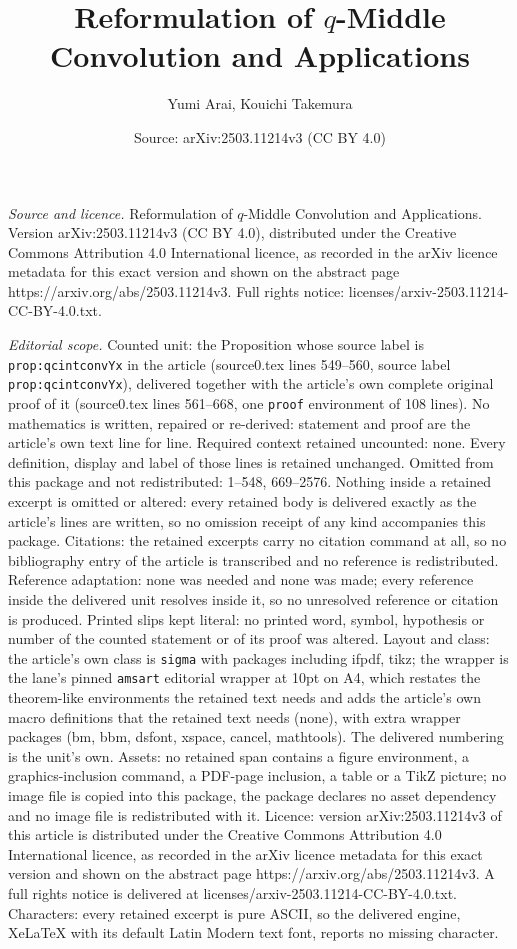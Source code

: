 \documentclass[10pt,a4paper]{amsart}
\title[Reformulation of $q$-Middle Convolution and Applications]{Reformulation of $q$-Middle Convolution and Applications}
\author{Yumi Arai, Kouichi Takemura}
\date{Source: arXiv:2503.11214v3 (CC BY 4.0)}
\begin{document}
\maketitle

\noindent\emph{Source and licence.} Reformulation of $q$-Middle Convolution and Applications. Version arXiv:2503.11214v3 (CC BY 4.0), distributed under the Creative Commons Attribution 4.0 International licence, as recorded in the arXiv licence metadata for this exact version and shown on the abstract page https://arxiv.org/abs/2503.11214v3. Full rights notice: licenses/arxiv-2503.11214-CC-BY-4.0.txt.\par\smallskip

\noindent\textit{Editorial scope.} Counted unit: the Proposition whose source label is \texttt{prop:qcintconvYx} in the article (source0.tex lines 549--560, source label \texttt{prop:qcintconvYx}), delivered together with the article's own complete original proof of it (source0.tex lines 561--668, one \texttt{proof} environment of 108 lines). No mathematics is written, repaired or re-derived: statement and proof are the article's own text line for line. Required context retained uncounted: none. Every definition, display and label of those lines is retained unchanged. Omitted from this package and not redistributed: 1--548, 669--2576. Nothing inside a retained excerpt is omitted or altered: every retained body is delivered exactly as the article's lines are written, so no omission receipt of any kind accompanies this package. Citations: the retained excerpts carry no citation command at all, so no bibliography entry of the article is transcribed and no reference is redistributed. Reference adaptation: none was needed and none was made; every reference inside the delivered unit resolves inside it, so no unresolved reference or citation is produced. Printed slips kept literal: no printed word, symbol, hypothesis or number of the counted statement or of its proof was altered. Layout and class: the article's own class is \texttt{sigma} with packages including ifpdf, tikz; the wrapper is the lane's pinned \texttt{amsart} editorial wrapper at 10pt on A4, which restates the theorem-like environments the retained text needs and adds the article's own macro definitions that the retained text needs (none), with extra wrapper packages (bm, bbm, dsfont, xspace, cancel, mathtools). The delivered numbering is the unit's own. Assets: no retained span contains a figure environment, a graphics-inclusion command, a PDF-page inclusion, a table or a TikZ picture; no image file is copied into this package, the package declares no asset dependency and no image file is redistributed with it. Licence: version arXiv:2503.11214v3 of this article is distributed under the Creative Commons Attribution 4.0 International licence, as recorded in the arXiv licence metadata for this exact version and shown on the abstract page https://arxiv.org/abs/2503.11214v3. A full rights notice is delivered at licenses/arxiv-2503.11214-CC-BY-4.0.txt. Characters: every retained excerpt is pure ASCII, so the delivered engine, XeLaTeX with its default Latin Modern text font, reports no missing character.
\end{document}
